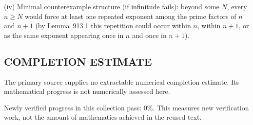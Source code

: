 (iv) Minimal counterexample structure (if infinitude fails): beyond some $N$, every $n\ge N$ would force at least one repeated exponent among the prime factors of $n$ and $n+1$ (by Lemma~913.1 this repetition could occur within $n$, within $n+1$, or as the same exponent appearing once in $n$ and once in $n+1$).




\subsection*{COMPLETION ESTIMATE}
The primary source supplies no extractable numerical completion estimate. Its mathematical progress is not numerically assessed here.

Newly verified progress in this collection pass: $0\%$. This measures new verification work, not the amount of mathematics achieved in the reused text.
